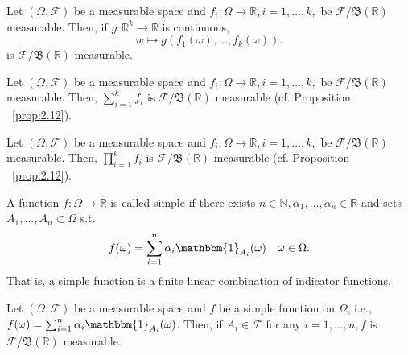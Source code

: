 \begin{proposition}
    \label{prop:7.6}
    Let $(\Omega, \mathcal{F})$ be a measurable space and $f_i: \Omega \to \mathbb{R}, i = 1, \ldots, k, \text{ be }
    \mathcal{F}/\mathfrak{B}(\mathbb{R})$ measurable. Then, if $g: \mathbb{R}^{k} \to \mathbb{R}$ is continuous,
    \[
    w \mapsto g(f_1(\omega), \ldots, f_k(\omega))
    .\] 
    is $\mathcal{F}/\mathfrak{B}(\mathbb{R})$ measurable. 
\end{proposition}

\begin{example}
    \label{ex:7.5}
    Let $(\Omega, \mathcal{F})$ be a measurable space and $f_i: \Omega \to \mathbb{R}, i = 1, \ldots, k, \text{ be }
    \mathcal{F}/\mathfrak{B}(\mathbb{R})$ measurable. Then, $\sum_{i=1}^{k} f_i$ is $\mathcal{F}/\mathfrak{B}(\mathbb{R})$
    measurable (cf. Proposition ~\ref{prop:2.12}).
\end{example}

\begin{example}
   \label{ex:7.6}
    Let $(\Omega, \mathcal{F})$ be a measurable space and $f_i: \Omega \to \mathbb{R}, i = 1, \ldots, k, \text{ be }
    \mathcal{F}/\mathfrak{B}(\mathbb{R})$ measurable. Then, $\prod_{i=1}^{k} f_i $ is $\mathcal{F}/\mathfrak{B}(\mathbb{R})$
    measurable (cf. Proposition ~\ref{prop:2.12}).
\end{example}

\begin{definition}
    \label{def:7.3}
    A function $f: \Omega \to \mathbb{R}$ is called simple if there exists $n \in \mathbb{N}, \alpha_1, \ldots, \alpha_n
    \in \mathbb{R}$ and sets $A_1, \ldots, A_n \subset \Omega$ s.t.
    \[
        f(\omega) = \sum_{i=1}^{n} \alpha_i \mathbbm{1}_{A_i}(\omega) \quad \omega \in \Omega
    .\] 
    That is, a simple function is a finite linear combination of indicator functions.
\end{definition}

\begin{example}
    \label{ex:7.7}
    Let $(\Omega, \mathcal{F})$ be a measurable space and $f$ be a simple function on $\Omega$, i.e.,
    $f(\omega) = \sum_{i=1}^{n} \alpha_i \mathbbm{1}_{A_i} (\omega)$. Then, if $A_i \in \mathcal{F}$ for any
    $i = 1, \ldots, n, f$ is $\mathcal{F}/\mathfrak{B}(\mathbb{R})$ measurable.
\end{example}


